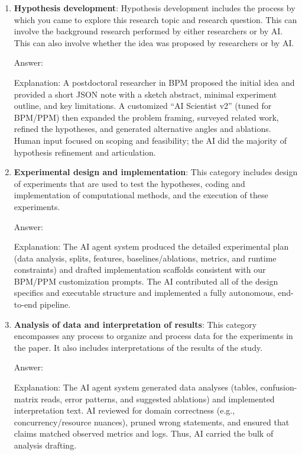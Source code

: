 \documentclass{article}
\theoremstyle{plain}
\theoremstyle{definition}
\theoremstyle{remark}
\begin{document}
	
	\begin{enumerate}
		\item \textbf{Hypothesis development}: Hypothesis development includes the process by which you came to explore this research topic and research question. This can involve the background research performed by either researchers or by AI. This can also involve whether the idea was proposed by researchers or by AI. 
		
		Answer: \involvementC{}
		
		Explanation: A postdoctoral researcher in BPM proposed the initial idea and provided a short JSON note with a sketch abstract, minimal experiment outline, and key limitations. A customized “AI Scientist v2” (tuned for BPM/PPM) then expanded the problem framing, surveyed related work, refined the hypotheses, and generated alternative angles and ablations. Human input focused on scoping and feasibility; the AI did the majority of hypothesis refinement and articulation.
		
		\item \textbf{Experimental design and implementation}: This category includes design of experiments that are used to test the hypotheses, coding and implementation of computational methods, and the execution of these experiments. 
		
		Answer: \involvementD{}
		
		Explanation: The AI agent system produced the detailed experimental plan (data analysis, splits, features, baselines/ablations, metrics, and runtime constraints) and drafted implementation scaffolds consistent with our BPM/PPM customization prompts. The AI contributed all of the design specifics and executable structure and implemented a fully autonomous, end-to-end pipeline.
		
		\item \textbf{Analysis of data and interpretation of results}: This category encompasses any process to organize and process data for the experiments in the paper. It also includes interpretations of the results of the study.
		
		
		Answer: \involvementD{}
		
		Explanation: The AI agent system generated data analyses (tables, confusion-matrix reads, error patterns, and suggested ablations) and implemented interpretation text. AI reviewed for domain correctness (e.g., concurrency/resource nuances), pruned wrong statements, and ensured that claims matched observed metrics and logs. Thus, AI carried the bulk of analysis drafting.
		

\end{enumerate}
\end{document}
